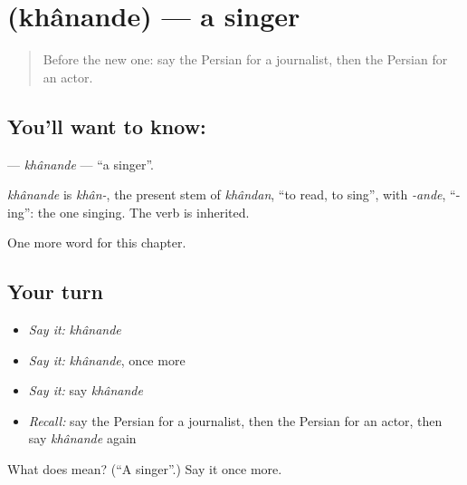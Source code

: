 \section[\texorpdfstring{\fa{خواننده} (khânande)}{خواننده (khânande)}]{ (khânande) — a singer}

\label{lesson:FA-C215-khanande}



\begin{quote}
Before the new one: say the Persian for a journalist, then the Persian for an actor.
\end{quote}

\subsection*{You'll want to know: }
\textbf{} — \emph{khânande} — \textquotedblleft{}a singer\textquotedblright{}.

\begin{cousinweb}
\emph{khânande} is \emph{khân-}, the present stem of \emph{khândan}, \textquotedblleft{}to read, to sing\textquotedblright{}, with \emph{-ande}, \textquotedblleft{}-ing\textquotedblright{}: the one singing. The verb is inherited.
\end{cousinweb}

\begin{grammarlens}[title={What you've built}]
One more word for this chapter.
\end{grammarlens}

\subsection*{Your turn}
\begin{itemize}
\raggedright
  \item \emph{Say it:} \emph{khânande}
  \item \emph{Say it:} \emph{khânande}, once more
  \item \emph{Say it:} say \emph{khânande}
  \item \emph{Recall:} say the Persian for a journalist, then the Persian for an actor, then say \emph{khânande} again
\end{itemize}

\begin{tcolorbox}[breakable,colback=teal!4,colframe=teal!35!black,title={Before you move on}]
What does  mean? (\textquotedblleft{}A singer\textquotedblright{}.) Say it once more.
\end{tcolorbox}
